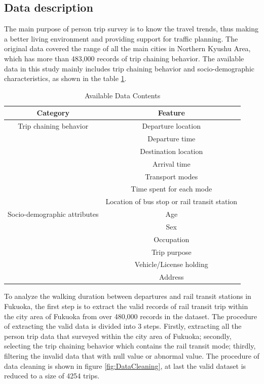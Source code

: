 \documentclass[sustainability,article,submit,moreauthors,pdftex,10pt,a4paper]{Definitions/mdpi}
\begin{document}
%
\subsection{Data description}
%
The main purpose of person trip survey is to know the travel trends, thus making a better living environment and providing support for traffic planning. The original data covered the range of all the main cities in Northern Kyushu Area, which has more than 483,000 records of trip chaining behavior. The available data in this study mainly includes trip chaining behavior and socio-demographic characteristics, as shown in the table \ref{table:AvailableData}.

%
\begin{table}[h]
	\centering
	\caption{Available Data Contents}
	\label{table:AvailableData}
	\begin{tabular}{cc}
		\toprule
		Category & Feature\\
		\midrule
		Trip chaining behavior & Departure location \\
		& Departure time \\
		& Destination location \\
		& Arrival time \\
		& Transport modes \\
		& Time spent for each mode \\
		& Location of bus stop or rail transit station \\
		\midrule
		Socio-demographic attributes & Age \\
		& Sex \\
		& Occupation \\
		& Trip purpose \\
		& Vehicle/License holding \\
		& Address \\
		\bottomrule
	\end{tabular}
	\normalsize
\end{table}

%
To analyze the walking duration between departures and rail transit stations in Fukuoka, the first step is to extract the valid records of rail transit trip within the city area of Fukuoka from over 480,000 records in the dataset. The procedure of extracting the valid data is divided into 3 steps. Firstly, extracting all the person trip data that surveyed within the city area of Fukuoka; secondly, selecting the trip chaining behavior which contains the rail transit mode; thirdly, filtering the invalid data that with null value or abnormal value. The procedure of data cleaning is shown in figure \ref{fig:DataCleaning}, at last the valid dataset is reduced to a size of 4254 trips.
\end{document}
